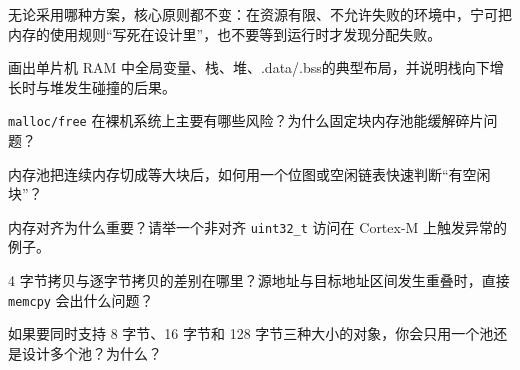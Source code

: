 无论采用哪种方案，核心原则都不变：在资源有限、不允许失败的环境中，宁可把内存的使用规则“写死在设计里”，也不要等到运行时才发现分配失败。

\begin{problemset}
\item 画出单片机 RAM 中全局变量、栈、堆、.data/.bss的典型布局，并说明栈向下增长时与堆发生碰撞的后果。
\item \texttt{malloc/free} 在裸机系统上主要有哪些风险？为什么固定块内存池能缓解碎片问题？
\item 内存池把连续内存切成等大块后，如何用一个位图或空闲链表快速判断“有空闲块”？
\item 内存对齐为什么重要？请举一个非对齐 \texttt{uint32\_t} 访问在 Cortex-M 上触发异常的例子。
\item 4 字节拷贝与逐字节拷贝的差别在哪里？源地址与目标地址区间发生重叠时，直接 \texttt{memcpy} 会出什么问题？
\item 如果要同时支持 8 字节、16 字节和 128 字节三种大小的对象，你会只用一个池还是设计多个池？为什么？
\end{problemset}
